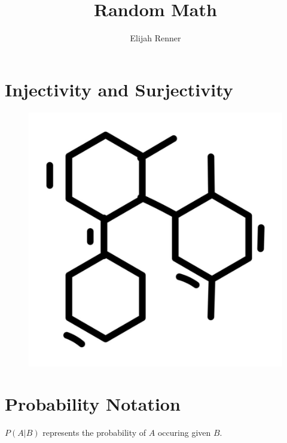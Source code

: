 \documentclass[12pt]{article}
\title{Random Math}
\author{Elijah Renner}
\begin{document}
\maketitle

\vspace{0.5in}

\tableofcontents

\section{Injectivity and Surjectivity}

\begin{figure}[H]
	\centering
	\includegraphics[scale=0.3]{maxresdefault.jpg}
\end{figure}

\section{Probability Notation}

\(P(A|B)\) represents the probability of \(A\) occuring given \(B\).
\end{document}
